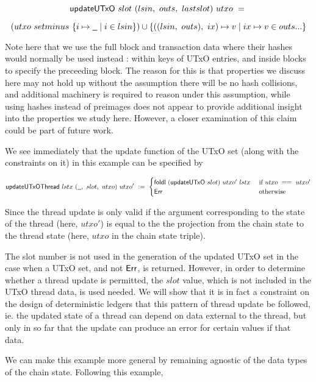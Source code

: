 \[ \mathsf{updateUTxO}~slot~(lsin,~outs,~lastslot)~utxo~=~\]

\[  (utxo~setminus~\{ i \mapsto \wcard \mid i \in lsin \}) \cup \{ ((lsin,~outs),~ix) \mapsto v \mid ix \mapsto v \in outs ... \}  \]

Note here that we use the full block and transaction data where their hashes would
normally be used instead : within keys of UTxO entries, and inside
blocks to specify the preceeding block. The reason for this is that properties
we discuss here may not hold up without the assumption there will be no hash collisions,
and additional machinery is required to reason under this assumption, while using
hashes instead of preimages does not appear to provide additional insight into the
properties we study here. However, a closer examination of this claim could be
part of future work.

We see immediately that the update function of the UTxO set (along with the
constraints on it) in this example can be specified by

\[ \fun{updateUTxOThread} ~lstx ~(\wcard,~slot,~ utxo)~ utxo'~ \leteq~ \begin{cases}
  \fun{foldl}~(\fun{updateUTxO}~slot)~utxo'~lstx & \text { if } utxo~==~utxo' \\
  \Err & \text{ otherwise}
\end{cases}  \]

Since the thread update is only valid if the argument corresponding to the state of the
thread (here, $utxo'$) is equal to the the projection from the chain state to the
thread state (here, $utxo$ in the chain state triple).

The slot number is not used in the generation
of the updated UTxO set in the case when a UTxO set, and not $\mathsf{Err}$, is returned. However, in order to
determine whether a thread update is permitted, the $slot$ value, which
is not included in the UTxO thread data, is used needed.
We will show that it is in fact a constraint on the design of deterministic ledgers
that this pattern of thread update
be followed, ie. the updated state of a thread can depend on data external to the thread,
but only in so far that the update can produce an error for certain values if that data.

We can make this example more general by remaining agnostic of the data types of the
chain state. Following this example,

